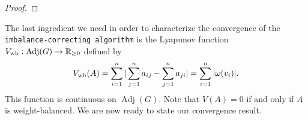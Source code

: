 \documentclass[final]{siamltex}
\begin{document}
\begin{proof}
  
  
  
  
  
  
  
  
  
  
  
  
  
  
  
  
  
  
  
  
  
  
\end{proof}

The last ingredient we need in order to characterize the convergence
of the {\texttt{imbalance-correcting algorithm}\xspace} is the Lyapunov function $ {{V}_{\textup{{wb}}}} : {\operatorname{Adj}}(G)
\rightarrow \mathbb{R}_{\geq 0} $ defined by
\begin{equation}\label{eq:V}
  {{V}_{\textup{{wb}}}}(A)=\sum_{i=1}^n
  |\sum_{j=1}^na_{ij}-\sum_{j=1}^na_{ji}| = \sum_{i=1}^n |\omega(v_i)|.
\end{equation}
This function is continuous on $ {\operatorname{Adj}}(G) $. Note that $V(A) = 0$ if
and only if $A$ is weight-balanced.  We are now ready to state our
convergence result.
\end{document}
